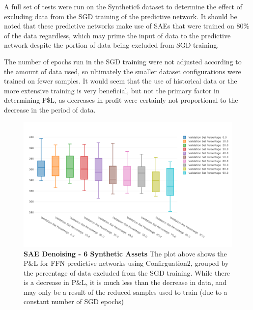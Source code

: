 \documentclass[a4paper,latin]{paper}
\begin{document}
A full set of tests were run on the Synthetic6 dataset to determine the effect of excluding data from the SGD training of the predictive network. It should be noted that these predictive networks make use of SAEs that were trained on 80\% of the data regardless, which may prime the input of data to the predictive network despite the portion of data being excluded from SGD training. \newline

The number of epochs run in the SGD training were not adjusted according to the amount of data used, so ultimately the smaller dataset configurations were trained on fewer samples. It would seem that the use of historical data or the more extensive training is very beneficial, but not the primary factor in determining P\$L, as decreases in profit were certainly not proportional to the decrease in the period of data.

\begin{figure}[H]
	\centering \includegraphics[scale=0.3]{images/iteration_three/it3_validationset.png}
	\caption{\textbf{SAE Denoising - 6 Synthetic Assets} \newline The plot above shows the P\&L for FFN predictive networks using Confirguation2, grouped by the percentage of data excluded from the SGD training. While there is a decrease in P\&L, it is much less than the decrease in data, and may only be a result of the reduced samples used to train (due to a constant number of SGD epochs)}
	\label{figure-results_it3_validationset}
\end{figure}


\end{document}
